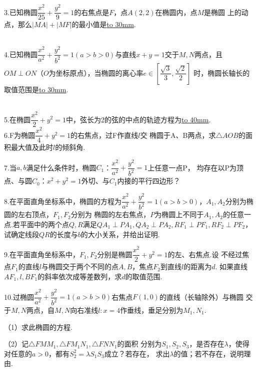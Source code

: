 3.已知椭圆$\dfrac{x^2}{25}+\dfrac{y^2}{9}=1$的右焦点是$F$，点$A(2,2)$在椭圆内，点$M$是椭圆
上的动点，那么$|MA|+|MF|$的最小值是\underline{\hbox to 30mm{}}.

~\\

4.已知椭圆$\dfrac{x^2}{a^2}+\dfrac{y^2}{b^2}=1(a>b>0)$与直线$x+y=1$交于$M,N$两点，且
$OM\perp ON$（$O$为坐标原点），当椭圆的离心率$e\in \left[\dfrac{\sqrt{3}}{3},\dfrac{\sqrt{2}}{2}\right]$
时，椭圆长轴长的取值范围是\underline{\hbox to 30mm{}}.

~\\

5.在椭圆$\dfrac{x^2}{2}+y^2=1$中，弦长为2的弦的中点的轨迹方程为\underline{\hbox to 40mm{}}.
~\\

6.F为椭圆$\dfrac{x^2}{4}+y^2=1$的右焦点，过F作直线$l$交
椭圆于A、B两点，求$\bigtriangleup AOB$的面积最大值及此时$l$的倾斜角.

\vspace*{45mm}

7.当$a,b$满足什么条件时，椭圆$C_1$：$\dfrac{x^2}{a^2}+\dfrac{y^2}{b^2}=1$上任意一点P，
均存在以P为顶点、与圆$C_0$：$x^2+y^2=1$外切、与$C_1$内接的平行四边形？

\vspace{45mm}

8.在平面直角坐标系中，椭圆的方程为$\dfrac{x^2}{a^2}+\dfrac{y^2}{b^2}=1(a>b>0)$，$A_1,A_2$分别为椭圆的左右顶点，$F_1,F_2$分别为
椭圆的左右焦点，$P$为椭圆上不同于$A_1,A_2$的任意一点.若平面中的两个点$Q,R$满足$QA_1\perp PA_1,QA_2\perp PA_2,RF_1\perp PF_1,RF_2\perp PF_2$，
试确定线段$QR$的长度与$b$的大小关系，并给出证明.
\newpage

9.在平面直角坐标系中，$F_1,F_2$分别是椭圆$\dfrac{x^2}{2}+y^2=1$的左、右焦点.设
不经过焦点$F_1$的直线$l$与椭圆交于两个不同的点$A,B$，焦点$F_2$到直线$l$的距离为$d$.
如果直线$AF_1,l,BF_1$的斜率依次成等差数列，求$d$的取值范围.
\vspace{60mm}

10.过椭圆$\dfrac{x^2}{a^2}+\dfrac{y^2}{b^2}=1(a>b>0)$右焦点$F(1,0)$的直线（长轴除外）与椭圆
交于$M,N$两点，自$M,N$向右准线$l:x=4$作垂线，垂足分别为$M_1,N_1$.

（1）求此椭圆的方程.

（2）记$\bigtriangleup FMM_1,\bigtriangleup FM_1N_1,\bigtriangleup FNN_1$的面积
分别为$S_1,S_2,S_3$，是否存在$\lambda$，使得对任意的$a>0$，都有$S_2^2=\lambda S_1S_3$成立？若存在，
求出$\lambda$的值；若不存在，说明理由.
\vspace*{60mm}

